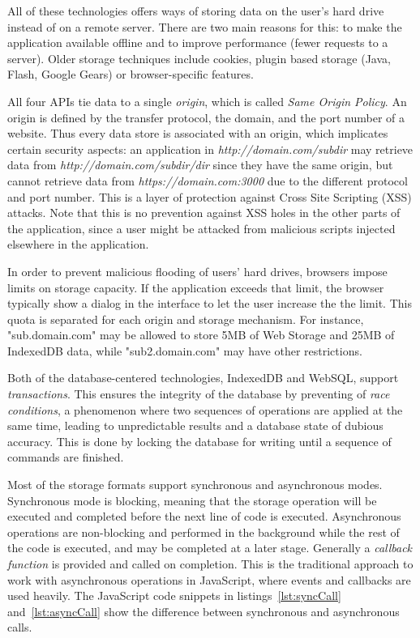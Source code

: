 All of these technologies offers ways of storing data on the user's hard drive instead of on a remote server. There are two main reasons for this: to make the application available offline and to improve performance (fewer requests to a server). Older storage techniques include cookies, plugin based storage (Java, Flash, Google Gears) or browser-specific features.

All four APIs tie data to a single \emph{origin}, which is called \emph{Same Origin Policy}. An origin is defined by the transfer protocol, the domain, and the port number of a website. Thus every data store is associated with an origin, which implicates certain security aspects: an application in \emph{http://domain.com/subdir} may retrieve data from \emph{http://domain.com/subdir/dir} since they have the same origin, but cannot retrieve data from \emph{https://domain.com:3000} due to the different protocol and port number. This is a layer of protection against Cross Site Scripting (XSS) attacks. Note that this is no prevention against XSS holes in the other parts of the application, since a user might be attacked from malicious scripts injected elsewhere in the application.

In order to prevent malicious flooding of users' hard drives, browsers impose limits on storage capacity. If the application exceeds that limit, the browser typically show a dialog in the interface to let the user increase the the limit. This quota is separated for each origin and storage mechanism. For instance, "sub.domain.com" may be allowed to store 5MB of Web Storage and 25MB of IndexedDB data, while "sub2.domain.com" may have other restrictions.

Both of the database-centered technologies, IndexedDB and WebSQL, support \emph{transactions}. This ensures the integrity of the database by preventing of \emph{race conditions}, a phenomenon where two sequences of operations are applied at the same time, leading to unpredictable results and a database state of dubious accuracy. This is done by locking the database for  writing until a sequence of commands are finished.

Most of the storage formats support synchronous and asynchronous modes. Synchronous mode is blocking, meaning that the storage operation will be executed and completed before the next line of code is executed. Asynchronous operations are non-blocking and performed in the background while the rest of the code is executed, and may be completed at a later stage. Generally a \emph{callback function} is provided and called on completion. This is the traditional approach to work with asynchronous operations in JavaScript, where events and callbacks are used heavily. The JavaScript code snippets in listings~\ref{lst:syncCall} and~\ref{lst:asyncCall} show the difference between synchronous and asynchronous calls.

